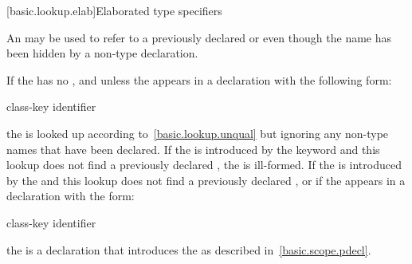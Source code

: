 [basic.lookup.elab]{Elaborated type specifiers}%
%

\pnum
An  may be
used to refer to a previously declared  or
 even though the name has been hidden by a non-type
declaration.

\pnum
If the  has no
, and unless the
 appears in a declaration with the
following form:

\begin{ncbnf}
class-key  identifier \terminal{;}
\end{ncbnf}

the  is looked up according
to~\ref{basic.lookup.unqual} but ignoring any non-type names that have
been declared. If the  is introduced
by the  keyword and this lookup does not find a previously
declared , the 
is ill-formed. If the  is introduced
by the  and this lookup does not find a previously
declared , or if the
 appears in a declaration with the
form:

\begin{ncbnf}
class-key  identifier \terminal{;}
\end{ncbnf}

the  is a declaration that
introduces the  as described
in~\ref{basic.scope.pdecl}.

